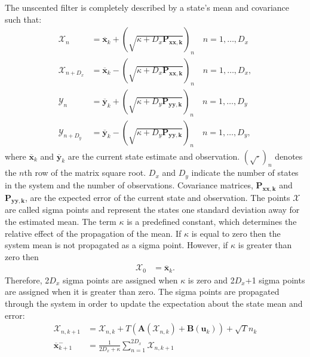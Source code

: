 The unscented filter is completely described by a state's mean and covariance such that:\begin{align}
\label{eqn: Unscented_Transform1}
\mathbf{\mathcal{X}}_{n} &= \mathbf{\overline{x}}_{k} + (\sqrt{\kappa+D_{x}\mathbf{P_{xx,k}}})_{n} \quad n=1,\hdots,D_x\\
\label{eqn: Unscented_Transform2}
\mathbf{\mathcal{X}}_{n+D_{x}} &= \mathbf{\overline{x}}_{k} - (\sqrt{\kappa+D_{x}\mathbf{P_{xx,k}}})_{n} \quad n=1,\hdots,D_x,\\
\label{eqn: Unscented_TransformY1}
\mathbf{\mathcal{Y}}_{n} &= \mathbf{\overline{y}}_{k} + (\sqrt{\kappa+D_{y}\mathbf{P_{yy,k}}})_{n} \quad n=1,\hdots,D_y\\
\label{eqn: Unscented_TransformY2}
\mathbf{\mathcal{Y}}_{n+D_{y}} &= \mathbf{\overline{y}}_{k} - (\sqrt{\kappa+D_{y}\mathbf{P_{yy,k}}})_{n} \quad n=1,\hdots,D_y,
\end{align} where $\mathbf{\overline{x}}_{k}$ and $\mathbf{\overline{y}}_{k}$ are the current state estimate and observation. $(\sqrt{\cdot})_{n}$ denotes the $n$th row of the matrix square root. $D_{x}$ and $D_{y}$ indicate the number of states in the system and the number of observations. Covariance matrices, $\mathbf{P_{xx,k}}$ and $\mathbf{P_{yy,k}}$, are the expected error of the current state and observation. The points $\mathbf{\mathcal{X}}$ are called sigma points and represent the states one standard deviation away for the estimated mean. The term $\kappa$ is a predefined constant, which determines the relative effect of the propagation of the mean. If $\kappa$ is equal to zero then the system mean is not propagated as a sigma point. However, if $\kappa$ is greater than zero then \begin{align}
\mathbf{\mathcal{X}}_{0} &= \mathbf{\overline{x}}_{k}.
\end{align} Therefore, 2$D_{x}$ sigma points are assigned when $\kappa$ is zero and 2$D_{x}$+1 sigma points are assigned when it is greater than zero. The sigma points are propagated through the system in order to update the expectation about the state mean and error: \begin{align}%
\mathbf{\mathcal{X}}_{n,k+1} &= \mathbf{\mathcal{X}}_{n,k}+ T(\mathbf{A}(\mathbf{\mathcal{X}}_{n,k}) +\mathbf{B}(\mathbf{u}_{k})) +\sqrt{T}{n}_{k}\\
\overline{\mathbf{x}}_{k+1}^{-} &= \frac{1}{2D_{x}+\kappa}\sum_{n=1}^{2D_{x}} \mathbf{\mathcal{X}}_{n,k+1}\\

\end{align}
